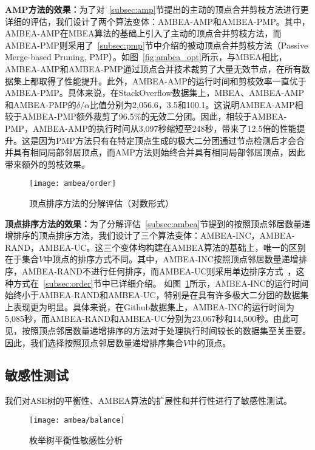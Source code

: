\textbf{AMP方法的效果：}为了对~\ref{subsec:amp}节提出的主动的顶点合并剪枝方法进行更详细的评估，我们设计了两个算法变体：AMBEA-AMP和AMBEA-PMP。其中，AMBEA-AMP在MBEA算法的基础上引入了主动的顶点合并剪枝方法，而AMBEA-PMP则采用了~\ref{subsec:pmp}节中介绍的被动顶点合并剪枝方法（Passive Merge-based Pruning, PMP）。如图~\ref{fig:ambea_opt}所示，与MBEA相比，AMBEA-AMP和AMBEA-PMP通过顶点合并技术裁剪了大量无效节点，在所有数据集上都取得了性能提升。此外，AMBEA-AMP的运行时间和剪枝效率一直优于AMBEA-PMP。具体来说，在StackOverflow数据集上，MBEA、AMBEA-AMP和AMBEA-PMP的$\delta/\alpha$比值分别为2,056.6，3.5和100.1。这说明AMBEA-AMP相较于AMBEA-PMP额外裁剪了96.5\%的无效二分团。因此，相较于AMBEA-PMP，AMBEA-AMP的执行时间从3,097秒缩短至248秒，带来了12.5倍的性能提升。这是因为PMP方法只有在特定顶点生成的极大二分团通过节点检测后才会合并具有相同局部邻居顶点，而AMP方法则始终合并具有相同局部邻居顶点，因此带来额外的剪枝效果。

\begin{figure} [H]
	\centering

		\texttt{[image: ambea/order]}
    \vspace{-2pt}

	\caption{顶点排序方法的分解评估（对数形式）}
    \vspace{-8pt}
	\label{fig:ambea_opt_order}
\end{figure}

\textbf{顶点排序方法的效果：}为了分解评估~\ref{subsec:ambea}节提到的按照顶点邻居数量递增排序的顶点排序方法，我们设计了三个算法变体：AMBEA-INC，AMBEA-RAND，AMBEA-UC。这三个变体均构建在AMBEA算法的基础上，唯一的区别在于集合$V$中顶点的排序方式不同。其中，AMBEA-INC按照顶点邻居数量递增排序，AMBEA-RAND不进行任何排序，而AMBEA-UC则采用单边排序方式~\cite{ooMBE22}，这种方式在~\ref{subsec:order}节中已详细介绍。
如图~\ref{fig:ambea_opt_order}所示，AMBEA-INC的运行时间始终小于AMBEA-RAND和AMBEA-UC，特别是在具有许多极大二分团的数据集上表现更为明显。具体来说，在Github数据集上，AMBEA-INC的运行时间为5,085秒，而AMBEA-RAND和AMBEA-UC分别为23,067秒和14,500秒。由此可见，按照顶点邻居数量递增排序的方法对于处理执行时间较长的数据集至关重要。因此，我们选择按照顶点邻居数量递增排序集合$V$中的顶点。


\subsection{敏感性测试}

我们对ASE树的平衡性、AMBEA算法的扩展性和并行性进行了敏感性测试。

\begin{figure} [t]
	\centering
	\texttt{[image: ambea/balance]}
	\caption{枚举树平衡性敏感性分析}
  \vspace{-8pt}
	\label{fig:ambea_exp_balance}
\end{figure}

